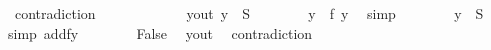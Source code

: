 \begin{isabellebody}
\ contradiction\isanewline
\ \ \ \ \isamarkupfalse%
\isanewline
\ \ \ \ \ \ \isamarkupfalse%
\ yout{\isacharcolon}{\kern0pt}\ {\isachardoublequoteopen}y\ {\isasymnotin}\ {\isacharquery}{\kern0pt}S{\isachardoublequoteclose}\isanewline
\ \ \ \ \ \ \isamarkupfalse%
\ {\isachardoublequoteopen}y\ {\isasymin}\ f\ y{\isachardoublequoteclose}\ \isamarkupfalse%
\ simp\isanewline
\ \ \ \ \ \ \isamarkupfalse%
\ {\isachardoublequoteopen}y\ {\isasymin}\ {\isacharquery}{\kern0pt}S{\isachardoublequoteclose}\ \ \isamarkupfalse%
{\isacharparenleft}{\kern0pt}simp\ add{\isacharcolon}{\kern0pt}fy{\isacharparenright}{\kern0pt}\isanewline
\ \ \ \ \ \ \isamarkupfalse%
\ False\ \isamarkupfalse%
\ yout\ \isamarkupfalse%
\ contradiction\isanewline
\ \ \ \ \isamarkupfalse%
\isanewline
\ \ \isamarkupfalse%
\isanewline
{}\isamarkupfalse%
%
\endisatagproof
{\isafoldproof}%
%
\isadelimproof
\isanewline
%
\endisadelimproof
%
\isadelimtheory
\isanewline
%
\endisadelimtheory
%
\isatagtheory
{}\isamarkupfalse%
%
\endisatagtheory
{\isafoldtheory}%
%
\isadelimtheory
%
\endisadelimtheory
%
\end{isabellebody}%
\endinput
